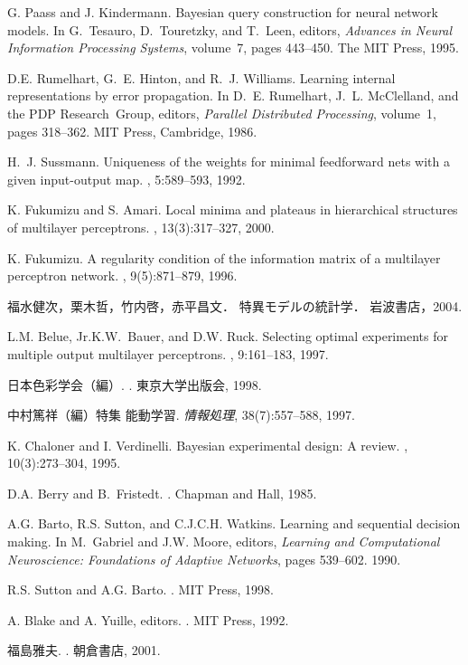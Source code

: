 \documentclass[master]{cimt}
\begin{document}
\begin{thebibliography}{10}
G. Paass and J. Kindermann.
\newblock Bayesian query construction for neural network models.
\newblock In G.~Tesauro, D.~Touretzky, and T.~Leen, editors, {\em Advances in
  Neural Information Processing Systems}, volume~7, pages 443--450. The {MIT}
  Press, 1995.

D.E. Rumelhart, G.~E. Hinton, and R.~J. Williams.
\newblock Learning internal representations by error propagation.
\newblock In D.~E. Rumelhart, J.~L. McClelland, and the PDP Research~Group,
  editors, {\em Parallel Distributed Processing}, volume~1, pages 318--362. MIT
  Press, Cambridge, 1986.

H.~J. Sussmann.
\newblock Uniqueness of the weights for minimal feedforward nets with a given
  input-output map.
, 5:589--593, 1992.

K. Fukumizu and S. Amari.
\newblock Local minima and plateaus in hierarchical structures of multilayer
  perceptrons.
, 13(3):317--327, 2000.

K. Fukumizu.
\newblock A regularity condition of the information matrix of a multilayer
  perceptron network.
, 9(5):871--879, 1996.

福水健次，栗木哲，竹内啓，赤平昌文．
\newblock 特異モデルの統計学．
\newblock 岩波書店，2004.

L.M. Belue, Jr.K.W.~Bauer, and D.W. Ruck.
\newblock Selecting optimal experiments for multiple output multilayer
  perceptrons.
, 9:161--183, 1997.

日本色彩学会（編）.
.
\newblock 東京大学出版会, 1998.

中村篤祥（編）特集 能動学習. {\em 情報処理}, 38(7):557--588, 1997.

K. Chaloner and I. Verdinelli.
\newblock Bayesian experimental design: A review.
, 10(3):273--304, 1995.

D.A. Berry and B.~Fristedt.
.
\newblock Chapman and Hall, 1985.

A.G. Barto, R.S. Sutton, and C.J.C.H. Watkins.
\newblock Learning and sequential decision making.
\newblock In M.~Gabriel and J.W. Moore, editors, {\em Learning and
  Computational Neuroscience: Foundations of Adaptive Networks}, pages
  539--602. 1990.

R.S. Sutton and A.G. Barto.
.
\newblock MIT Press, 1998.

A. Blake and A. Yuille, editors.
.
\newblock MIT Press, 1992.

福島雅夫.
.
\newblock 朝倉書店, 2001.


\end{thebibliography}
\end{document}
